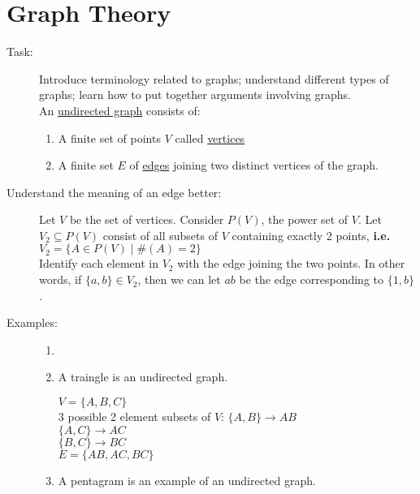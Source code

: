 \documentclass[10pt]{article}
\begin{document}
	\section{Graph Theory}
	\begin{description}
		\item[Task:] Introduce terminology related to graphs; understand different types of graphs; learn how to put together arguments involving graphs. \\
		An \underline{undirected graph} consists of:
		\begin{enumerate}
			\item A finite set of points $V$ called \underline{vertices}
			\item A finite set $E$ of \underline{edges} joining two distinct vertices of the graph.
		\end{enumerate}
		\item[Understand the meaning of an edge better:] Let $V$ be the set of vertices. Consider $P(V)$, the power set of $V$. Let $V_2 \subseteq P(V)$ consist of all subsets of $V$ containing exactly 2 points, \textbf{i.e.} $V_2 = \{A \in P(V) \mid \#(A)=2 \}$ \\
		Identify each element in $V_2$ with the edge joining the two points. In other words, if $\{a, b\} \in V_2$, then we can let $ab$ be the edge corresponding to $\{1, b\}$.
		\item[Examples:]
		\begin{enumerate}
			\item[]
			\item A traingle is an undirected graph. \\
			\begin{figure}[h!]
				\centering
			\end{figure}
			$V = \{A, B, C\}$ \\
			3 possible 2 element subsets of $V$:
			$\{A, B\} \rightarrow AB$ \\
			$\{A, C\} \rightarrow AC$ \\
			$\{B, C\} \rightarrow BC$ \\
			$E = \{AB, AC, BC\}$
			\item A pentagram is an example of an undirected graph. \\
			\begin{figure}[h!]
				\centering
\end{figure}
\end{enumerate}
\end{description}
\end{document}
